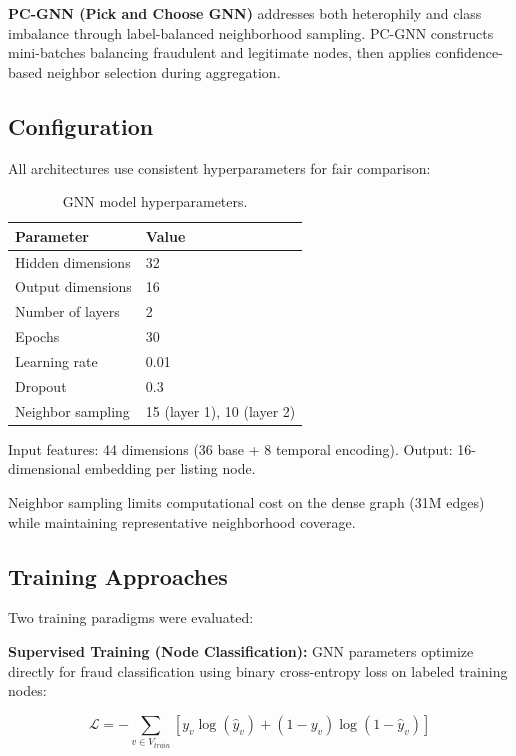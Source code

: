 \textbf{PC-GNN (Pick and Choose GNN)} addresses both heterophily and class imbalance through label-balanced neighborhood sampling. PC-GNN constructs mini-batches balancing fraudulent and legitimate nodes, then applies confidence-based neighbor selection during aggregation.

\subsection{Configuration}

All architectures use consistent hyperparameters for fair comparison:

\begin{table}[h]
\centering
\caption{GNN model hyperparameters.}
\begin{tabular}{ll}
\hline
Parameter & Value \\
\hline
Hidden dimensions & 32 \\
Output dimensions & 16 \\
Number of layers & 2 \\
Epochs & 30 \\
Learning rate & 0.01 \\
Dropout & 0.3 \\
Neighbor sampling & 15 (layer 1), 10 (layer 2) \\
\hline
\end{tabular}
\end{table}

Input features: 44 dimensions (36 base + 8 temporal encoding).
Output: 16-dimensional embedding per listing node.

Neighbor sampling limits computational cost on the dense graph (31M edges) while maintaining representative neighborhood coverage.

\subsection{Training Approaches}

Two training paradigms were evaluated:

\textbf{Supervised Training (Node Classification):} GNN parameters optimize directly for fraud classification using binary cross-entropy loss on labeled training nodes:

\begin{equation}
\mathcal{L} = -\sum_{v \in V_{train}} \left[ y_v \log(\hat{y}_v) + (1-y_v) \log(1-\hat{y}_v) \right]
\end{equation}


